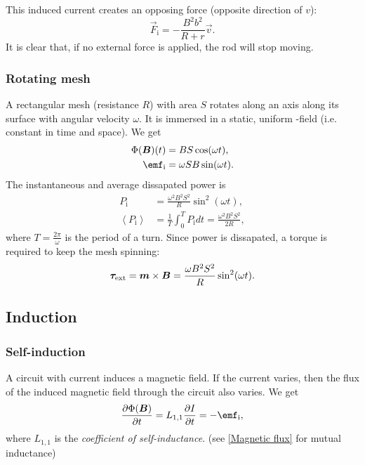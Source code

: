         This induced current creates an opposing force (opposite direction of $v$): 
        \begin{equation}
            \vec{F}_\text{i} = -\frac{B^2b^2}{R+r}\vec{v}.
        \end{equation}
        It is clear that, if no external force is applied, the rod will stop moving.

    \subsubsection{Rotating mesh}
        A rectangular mesh (resistance $R$) with area $S$ rotates along an axis along its surface with angular velocity $\omega$. 
        It is immersed in a static, uniform \B-field (i.e. constant in time and space).
        We get 
        \begin{align}
            \Phi(\B)(t) &= BS\cos (\omega t), \\
            \emf_\text{i} &= \omega S B \sin (\omega t).
        \end{align}
        The instantaneous and average dissapated power is 
        \begin{align}
            P_\text{i} &= \frac{\omega^2 B^2 S^2}{R}\sin^2(\omega t),\\
            \left<P_\text{i}\right> &= \frac{1}{T}\int_0^T P_\text{i}dt = \frac{\omega^2 B^2 S^2}{2R},
        \end{align}
        where $T = \frac{2\pi}{\omega}$ is the period of a turn.
        Since power is dissapated, a torque is required to keep the mesh spinning: 
        \begin{equation}
            \bm{\tau}_\text{ext} = \bm{m}\times\bm{B} = \frac{\omega B^2 S^2}{R}\sin^2(\omega t).
        \end{equation}
    
\subsection{Induction}
    \subsubsection{Self-induction}
        A circuit with current induces a magnetic field. 
        If the current varies, then the flux of the induced magnetic field through the circuit also varies. 
        We get
        \begin{equation}
            \frac{\partial \Phi(\B)}{\partial t} = L_{1,1}\frac{\partial I}{\partial t} = -\emf_{\text{i}},
        \end{equation}
        where $L_{1,1}$ is the \textit{coefficient of self-inductance}. (see \ref{Magnetic flux} for mutual inductance)
        
